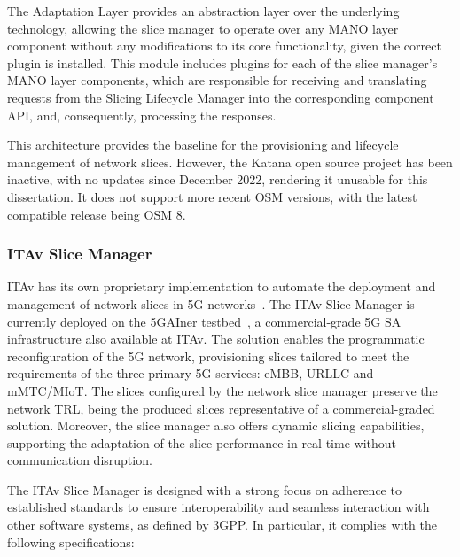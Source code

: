 
The Adaptation Layer provides an abstraction layer over the underlying technology, allowing the slice manager to operate over any \acs{MANO} layer component without any modifications to its core functionality, given the correct plugin is installed. This module includes plugins for each of the slice manager's \acs{MANO} layer components, which are responsible for receiving and translating requests from the Slicing Lifecycle Manager into the corresponding component \acs{API}, and, consequently, processing the responses.


This architecture provides the baseline for the provisioning and lifecycle management of network slices. However, the Katana open source project has been inactive, with no updates since December 2022, rendering it unusable for this dissertation. It does not support more recent \acs{OSM} versions, with the latest compatible release being \acs{OSM} 8.


\subsubsection{ITAv Slice Manager}

\acf{ITAv} has its own proprietary implementation to automate the deployment and management of network slices in \acs{5G} networks~\cite{ITAvSliceManager}. The \acs{ITAv} Slice Manager is currently deployed on the 5GAIner testbed~\cite{5GAIner}, a commercial-grade \acs{5G SA} infrastructure also available at \acs{ITAv}. The solution enables the programmatic reconfiguration of the \acs{5G} network, provisioning slices tailored to meet the requirements of the three primary \acs{5G} services: \acs{eMBB}, \acs{URLLC} and \acs{mMTC}/\acs{MIoT}. The slices configured by the network slice manager preserve the network \acf{TRL}, being the produced
slices representative of a commercial-graded solution. Moreover, the slice manager also offers dynamic slicing capabilities, supporting the adaptation of the slice performance in real time without communication disruption.

The \acs{ITAv} Slice Manager is designed with a strong focus on adherence to established standards to ensure interoperability and seamless interaction with other software systems, as defined by \acs{3GPP}. In particular, it complies with the following specifications:

